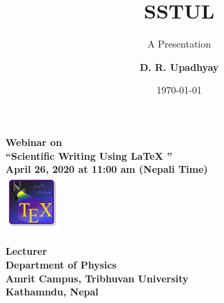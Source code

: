 \documentclass{beamer}
\author{\bf{D. R. Upadhyay}}
\institute{Amrit Campus,TU}
\title[SSTUL]{\Huge\bf{SSTUL
	}}
\subtitle{A Presentation}
\date{\today}
\begin{document}
		\begin{frame}
			\begin{center}
				{\Huge\bf{ \color{blue}Webinar on\\\color{red}\LARGE``Scientific Writing Using LaTeX
					''}\\[0.2cm]
				\color{blue}\large  April 26, 2020 at \color{red}11:00 am (Nepali Time)\\[0.2cm]}
				\includegraphics[height=2cm]{Tex}\\[0.1cm]
			\bf	\Large{}
				\\Lecturer\color{blue}\\ Department of Physics\\ Amrit Campus, Tribhuvan University\\
			 Kathamndu, Nepal\\
			\end{center}
		\end{frame}
		
\end{document}
